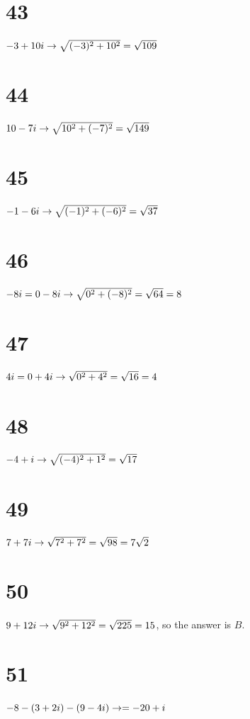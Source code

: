 \documentclass{article}
\theoremstyle{definition}
\begin{document}
\section*{43}
$-3+10i\newline\rightarrow \sqrt{(-3)^2+10^2}=\sqrt{109}$

\section*{44}
$10-7i\newline\rightarrow \sqrt{10^2+(-7)^2}=\sqrt{149}$

\section*{45}
$-1-6i\newline\rightarrow \sqrt{(-1)^2+(-6)^2}=\sqrt{37}$

\section*{46}
$-8i=0-8i\newline\rightarrow \sqrt{0^2+(-8)^2}=\sqrt{64}=8$

\section*{47}
$4i=0+4i\newline\rightarrow \sqrt{0^2+4^2}=\sqrt{16}=4$

\section*{48}
$-4+i\newline\rightarrow \sqrt{(-4)^2+1^2}=\sqrt{17}$

\section*{49}
$7+7i\newline\rightarrow \sqrt{7^2+7^2}=\sqrt{98}=7\sqrt{2}$

\section*{50}
$9+12i\newline\rightarrow \sqrt{9^2+12^2}=\sqrt{225}=15$, so the answer is $B$.

\section*{51}
$-8-(3+2i)-(9-4i)\newline\rightarrow =-20+i$
\end{document}
